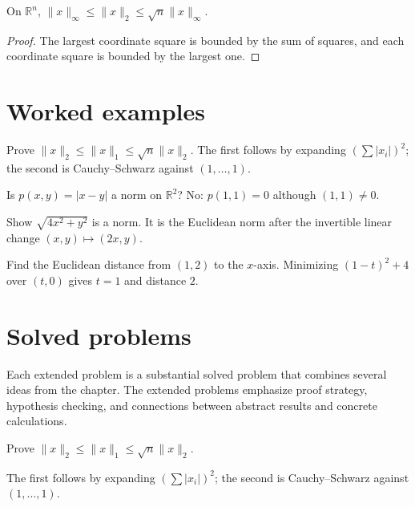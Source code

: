 \begin{theorem}\label{thm:ii02-03}
On $\mathbb R^n$, $\|x\|_\infty\le\|x\|_2\le\sqrt n\|x\|_\infty$.
\begin{proof}
The largest coordinate square is bounded by the sum of squares, and each coordinate square is bounded by the largest one.
\end{proof}
\end{theorem}

\section{Worked examples}

\begin{example}\label{ex:ii02-worked-01}
Prove $\|x\|_2\le\|x\|_1\le\sqrt n\|x\|_2$. The first follows by expanding $(\sum|x_i|)^2$; the second is Cauchy--Schwarz against $(1,\dots,1)$.
\end{example}

\begin{example}\label{ex:ii02-worked-02}
Is $p(x,y)=|x-y|$ a norm on $\mathbb R^2$? No: $p(1,1)=0$ although $(1,1)\ne0$.
\end{example}

\begin{example}\label{ex:ii02-worked-03}
Show $\sqrt{4x^2+y^2}$ is a norm. It is the Euclidean norm after the invertible linear change $(x,y)\mapsto(2x,y)$.
\end{example}

\begin{example}\label{ex:ii02-worked-04}
Find the Euclidean distance from $(1,2)$ to the $x$-axis. Minimizing $(1-t)^2+4$ over $(t,0)$ gives $t=1$ and distance $2$.
\end{example}

\section{Solved problems}
Each extended problem is a substantial solved problem that combines several ideas from the chapter. The extended problems emphasize proof strategy, hypothesis checking, and connections between abstract results and concrete calculations.

\begin{problem}\label{prob:ii02-problem-01}
Prove $\|x\|_2\le\|x\|_1\le\sqrt n\|x\|_2$.
\end{problem}
\begin{solution}
The first follows by expanding $(\sum|x_i|)^2$; the second is Cauchy--Schwarz against $(1,\dots,1)$.
\end{solution}

